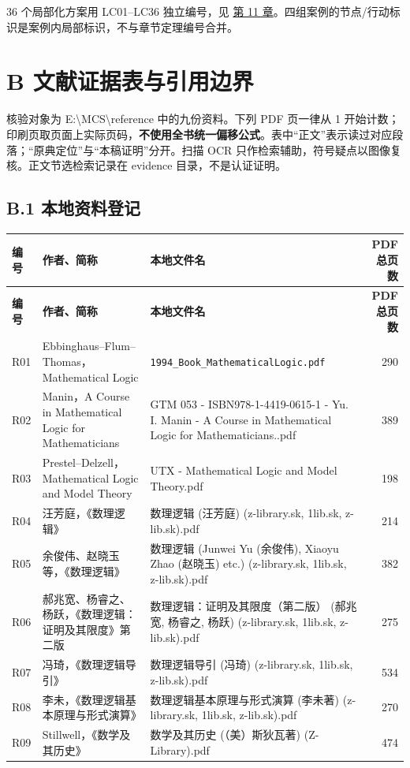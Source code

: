 \documentclass[UTF8,a4paper,zihao=-4,fontset=windows,openany]{ctexbook}
\newcommand{\mcsorigin}[1]{\par\noindent{\small\color{black!55}#1}\par\addvspace{0.8em}}
\newcommand{\mcsbrk}{\penalty 200\relax}
\begin{document}
36 个局部化方案用 LC01–LC36 独立编号，见 \hyperref[mcs-source-13]{第 11 章}。四组案例的节点/行动标识是案例内局部标识，不与章节定理编号合并。

\clearpage\chapter{B 文献证据表与引用边界}
\label{mcs-source-25}
\mcsorigin{原章节：B-文献证据表.md}
核验对象为 E:\textbackslash{}MCS\textbackslash{}reference 中的九份资料。下列 PDF 页一律从 1 开始计数；印刷页取页面上实际页码，\textbf{不使用全书统一偏移公式}。表中“正文”表示读过对应段落；“原典定位”与“本稿证明”分开。扫描 OCR 只作检索辅助，符号疑点以图像复核。正文节选检索记录在 evidence 目录，不是认证证明。

\section{B.1 本地资料登记}
\begingroup\small\setlength{\tabcolsep}{4pt}
\begin{longtable}{l>{\raggedright\arraybackslash}p{}>{\raggedright\arraybackslash}p{}r}
\toprule
\textbf{编号} & \textbf{作者、简称} & \textbf{本地文件名} & \textbf{PDF 总页数} \\
\midrule
\endfirsthead
\toprule
\textbf{编号} & \textbf{作者、简称} & \textbf{本地文件名} & \textbf{PDF 总页数} \\
\midrule
\endhead
\bottomrule
\endfoot
\bottomrule
\endlastfoot
R01 & Ebbinghaus–Flum–Thomas，Mathematical Logic & \texttt{1994\mcsbrk\_Book\mcsbrk\_Mathem\mcsbrk{}atical\mcsbrk{}Logic.pdf} & 290 \\
R02 & Manin，A Course in Mathematical Logic for Mathematicians & GTM 053 - ISBN978-1-4419-0615-1 - Yu. I. Manin - A Course in Mathematical Logic for Mathematicians..pdf & 389 \\
R03 & Prestel–Delzell，Mathematical Logic and Model Theory & UTX - Mathematical Logic and Model Theory.pdf & 198 \\
R04 & 汪芳庭，《数理逻辑》 & 数理逻辑 (汪芳庭) (z-library.sk, 1lib.sk, z-lib.sk).pdf & 214 \\
R05 & 余俊伟、赵晓玉等，《数理逻辑》 & 数理逻辑 (Junwei Yu (余俊伟), Xiaoyu Zhao (赵晓玉) etc.) (z-library.sk, 1lib.sk, z-lib.sk).pdf & 382 \\
R06 & 郝兆宽、杨睿之、杨跃，《数理逻辑：证明及其限度》第二版 & 数理逻辑：证明及其限度（第二版） (郝兆宽, 杨睿之, 杨跃) (z-library.sk, 1lib.sk, z-lib.sk).pdf & 275 \\
R07 & 冯琦，《数理逻辑导引》 & 数理逻辑导引 (冯琦) (z-library.sk, 1lib.sk, z-lib.sk).pdf & 534 \\
R08 & 李未，《数理逻辑基本原理与形式演算》 & 数理逻辑基本原理与形式演算 (李未著) (z-library.sk, 1lib.sk, z-lib.sk).pdf & 270 \\
R09 & Stillwell，《数学及其历史》 & 数学及其历史 (（美）斯狄瓦著) (Z-Library).pdf & 474 \\
\end{longtable}
\endgroup
\end{document}
